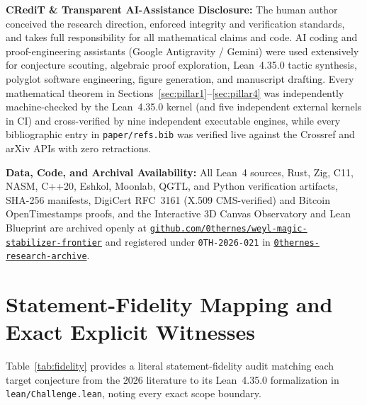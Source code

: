 \documentclass[11pt,letterpaper]{article}
\theoremstyle{plain}
\theoremstyle{definition}
\theoremstyle{remark}
\begin{document}
\noindent\textbf{CRediT \& Transparent AI-Assistance Disclosure:} The human author conceived the research direction, enforced integrity and verification standards, and takes full responsibility for all mathematical claims and code. AI coding and proof-engineering assistants (Google Antigravity / Gemini) were used extensively for conjecture scouting, algebraic proof exploration, Lean~4.35.0 tactic synthesis, polyglot software engineering, figure generation, and manuscript drafting. Every mathematical theorem in Sections~\ref{sec:pillar1}--\ref{sec:pillar4} was independently machine-checked by the Lean~4.35.0 kernel (and five independent external kernels in CI) and cross-verified by nine independent executable engines, while every bibliographic entry in \texttt{paper/refs.bib} was verified live against the Crossref and arXiv APIs with zero retractions.

\noindent\textbf{Data, Code, and Archival Availability:} All Lean~4 sources, Rust, Zig, C11, NASM, C++20, Eshkol, Moonlab, QGTL, and Python verification artifacts, SHA-256 manifests, DigiCert RFC~3161 (X.509 CMS-verified) and Bitcoin OpenTimestamps proofs, and the Interactive 3D Canvas Observatory and Lean Blueprint are archived openly at \href{https://github.com/0thernes/weyl-magic-stabilizer-frontier}{\texttt{github.com/\allowbreak 0thernes/\allowbreak weyl-\allowbreak magic-\allowbreak stabilizer-\allowbreak frontier}} and registered under \texttt{0TH-2026-021} in \href{https://github.com/0thernes/0thernes-research-archive}{\texttt{0thernes-\allowbreak research-\allowbreak archive}}.

\clearpage
\appendix

\section{Statement-Fidelity Mapping and Exact Explicit Witnesses}
\label{app:witnesses}

Table~\ref{tab:fidelity} provides a literal statement-fidelity audit matching each target conjecture from the 2026 literature to its Lean~4.35.0 formalization in \texttt{lean/Challenge.lean}, noting every exact scope boundary.
\end{document}
